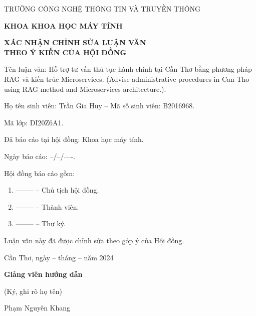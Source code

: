 \begin{center}
    TRƯỜNG CÔNG NGHỆ THÔNG TIN VÀ TRUYỀN THÔNG

    \textbf{KHOA KHOA HỌC MÁY TÍNH}

    \vspace{1.5cm}

    \textbf{\large XÁC NHẬN CHỈNH SỬA LUẬN VĂN \\ THEO Ý KIẾN CỦA HỘI ĐỒNG}
\end{center}

{
\noindent
Tên luận văn: Hỗ trợ tư vấn thủ tục hành chính tại Cần Thơ bằng phương pháp RAG và kiến trúc Microservices. (Advise administrative procedures in Can Tho using RAG method and Microservices architecture.).

\noindent
Họ tên sinh viên: Trần Gia Huy -- Mã số sinh viên: B2016968.

\noindent
Mã lớp: DI20Z6A1.

\noindent
Đã báo cáo tại hội đồng: Khoa học máy tính.

\noindent
Ngày báo cáo: --/--/----.

\noindent
Hội đồng báo cáo gồm: %
\begin{enumerate}
    \item -------- -- Chủ tịch hội đồng.
    \item -------- -- Thành viên.
    \item -------- -- Thư ký.
\end{enumerate}

\noindent
Luận văn này đã được chỉnh sửa theo góp ý của Hội đồng.


\begin{multicols}{2}
    \begin{minipage}{\linewidth}
    \end{minipage}

    \begin{minipage}{\linewidth}
        \centering
        Cần Thơ, ngày -- tháng -- năm 2024 %

        \textbf{Giảng viên hướng dẫn}

        (Ký, ghi rõ họ tên) \\

        \vspace{2.5cm}

        Phạm Nguyên Khang
    \end{minipage}
\end{multicols}
}